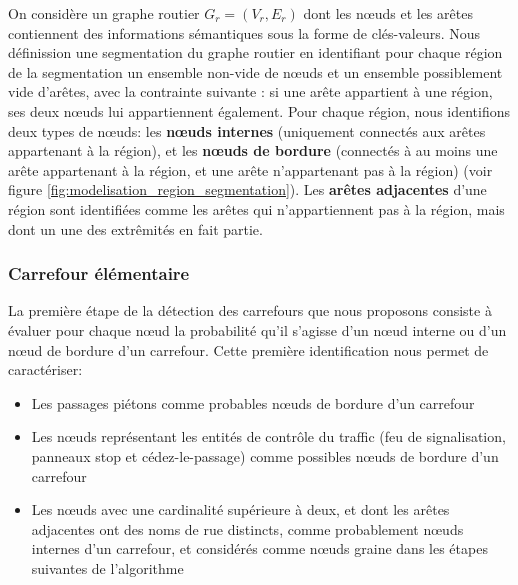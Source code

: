 On considère un graphe routier $G_r = (V_r,E_r)$ dont les nœuds et les arêtes contiennent des informations sémantiques sous la forme de clés-valeurs. Nous définission une segmentation du graphe routier en identifiant pour chaque région de la segmentation un ensemble non-vide de nœuds et un ensemble possiblement vide d'arêtes, avec la contrainte suivante : si une arête appartient à une région, ses deux nœuds lui appartiennent également.
Pour chaque région, nous identifions deux types de nœuds: les \textbf{nœuds internes} (uniquement connectés aux arêtes appartenant à la région), et les \textbf{nœuds de bordure} (connectés à au moins une arête appartenant à la région, et une arête n'appartenant pas à la région) (voir figure \ref{fig:modelisation_region_segmentation}).
Les \textbf{arêtes adjacentes} d'une région sont identifiées comme les arêtes qui n'appartiennent pas à la région, mais dont un une des extrêmités en fait partie.

\subsubsection{Carrefour élémentaire}

La première étape de la détection des carrefours que nous proposons consiste à évaluer pour chaque nœud la probabilité qu'il s'agisse d'un nœud interne ou d'un nœud de bordure d'un carrefour.
Cette première identification nous permet de caractériser:

\begin{itemize}
    \item Les passages piétons comme probables nœuds de bordure d'un carrefour
    \item Les nœuds représentant les entités de contrôle du traffic (feu de signalisation, panneaux stop et cédez-le-passage) comme possibles nœuds de bordure d'un carrefour
    \item Les nœuds avec une cardinalité supérieure à deux, et dont les arêtes adjacentes ont des noms de rue distincts, comme probablement nœuds internes d'un carrefour, et considérés comme nœuds graine dans les étapes suivantes de l'algorithme
\end{itemize}

